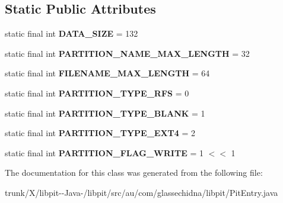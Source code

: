 \subsection*{Static Public Attributes}
\begin{DoxyCompactItemize}
\item 
\hypertarget{classau_1_1com_1_1glassechidna_1_1libpit_1_1PitEntry_a6afdbe6629660155ad2167bfe88cf8dd}{static final int {\bfseries D\-A\-T\-A\-\_\-\-S\-I\-Z\-E} = 132}\label{classau_1_1com_1_1glassechidna_1_1libpit_1_1PitEntry_a6afdbe6629660155ad2167bfe88cf8dd}

\item 
\hypertarget{classau_1_1com_1_1glassechidna_1_1libpit_1_1PitEntry_aa323a2eaea267a14aa17531bbcb3b3d8}{static final int {\bfseries P\-A\-R\-T\-I\-T\-I\-O\-N\-\_\-\-N\-A\-M\-E\-\_\-\-M\-A\-X\-\_\-\-L\-E\-N\-G\-T\-H} = 32}\label{classau_1_1com_1_1glassechidna_1_1libpit_1_1PitEntry_aa323a2eaea267a14aa17531bbcb3b3d8}

\item 
\hypertarget{classau_1_1com_1_1glassechidna_1_1libpit_1_1PitEntry_ac5e8c5489adc8d561a54b35312c8fcc6}{static final int {\bfseries F\-I\-L\-E\-N\-A\-M\-E\-\_\-\-M\-A\-X\-\_\-\-L\-E\-N\-G\-T\-H} = 64}\label{classau_1_1com_1_1glassechidna_1_1libpit_1_1PitEntry_ac5e8c5489adc8d561a54b35312c8fcc6}

\item 
\hypertarget{classau_1_1com_1_1glassechidna_1_1libpit_1_1PitEntry_a36816adb4c70554aacdd6d4c228a7bd4}{static final int {\bfseries P\-A\-R\-T\-I\-T\-I\-O\-N\-\_\-\-T\-Y\-P\-E\-\_\-\-R\-F\-S} = 0}\label{classau_1_1com_1_1glassechidna_1_1libpit_1_1PitEntry_a36816adb4c70554aacdd6d4c228a7bd4}

\item 
\hypertarget{classau_1_1com_1_1glassechidna_1_1libpit_1_1PitEntry_a51c9e319e604459876848a1da070aa36}{static final int {\bfseries P\-A\-R\-T\-I\-T\-I\-O\-N\-\_\-\-T\-Y\-P\-E\-\_\-\-B\-L\-A\-N\-K} = 1}\label{classau_1_1com_1_1glassechidna_1_1libpit_1_1PitEntry_a51c9e319e604459876848a1da070aa36}

\item 
\hypertarget{classau_1_1com_1_1glassechidna_1_1libpit_1_1PitEntry_a7969ff7b7eab72a51db68c4bc60d3d7f}{static final int {\bfseries P\-A\-R\-T\-I\-T\-I\-O\-N\-\_\-\-T\-Y\-P\-E\-\_\-\-E\-X\-T4} = 2}\label{classau_1_1com_1_1glassechidna_1_1libpit_1_1PitEntry_a7969ff7b7eab72a51db68c4bc60d3d7f}

\item 
\hypertarget{classau_1_1com_1_1glassechidna_1_1libpit_1_1PitEntry_ada5830133ec142ec1fa7e948d1468e31}{static final int {\bfseries P\-A\-R\-T\-I\-T\-I\-O\-N\-\_\-\-F\-L\-A\-G\-\_\-\-W\-R\-I\-T\-E} = 1 $<$$<$ 1}\label{classau_1_1com_1_1glassechidna_1_1libpit_1_1PitEntry_ada5830133ec142ec1fa7e948d1468e31}

\end{DoxyCompactItemize}


The documentation for this class was generated from the following file\-:\begin{DoxyCompactItemize}
\item 
trunk/\-X/libpit-\/-\/\-Java-\//libpit/src/au/com/glassechidna/libpit/Pit\-Entry.\-java\end{DoxyCompactItemize}
